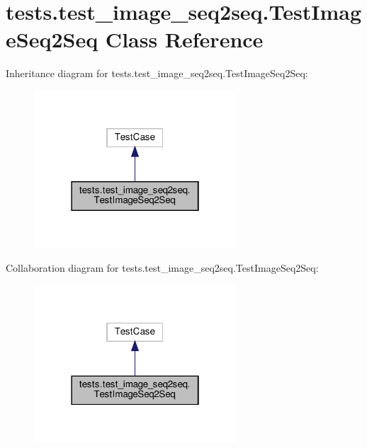 \hypertarget{classtests_1_1test__image__seq2seq_1_1TestImageSeq2Seq}{}\section{tests.\+test\+\_\+image\+\_\+seq2seq.\+Test\+Image\+Seq2\+Seq Class Reference}
\label{classtests_1_1test__image__seq2seq_1_1TestImageSeq2Seq}


Inheritance diagram for tests.\+test\+\_\+image\+\_\+seq2seq.\+Test\+Image\+Seq2\+Seq\+:
\nopagebreak
\begin{figure}[H]
\begin{center}
\leavevmode
\includegraphics[width=214pt]{dc/de4/classtests_1_1test__image__seq2seq_1_1TestImageSeq2Seq__inherit__graph}
\end{center}
\end{figure}


Collaboration diagram for tests.\+test\+\_\+image\+\_\+seq2seq.\+Test\+Image\+Seq2\+Seq\+:
\nopagebreak
\begin{figure}[H]
\begin{center}
\leavevmode
\includegraphics[width=214pt]{d8/d99/classtests_1_1test__image__seq2seq_1_1TestImageSeq2Seq__coll__graph}
\end{center}
\end{figure}
